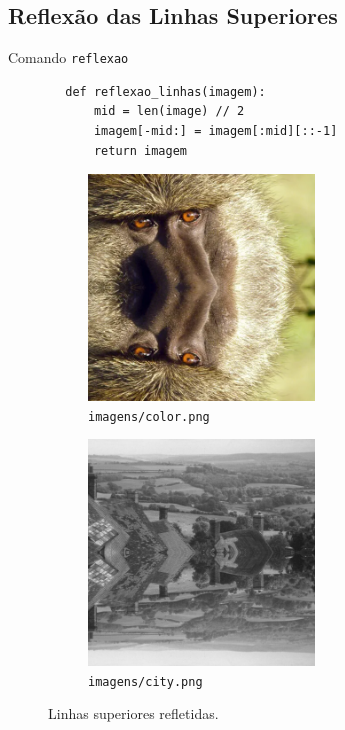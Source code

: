 \subsection{Reflexão das Linhas Superiores}

\begin{listing}[H]
    \caption{Comando \texttt{reflexao}}

    \begin{verbatim}
        def reflexao_linhas(imagem):
            mid = len(image) // 2
            imagem[-mid:] = imagem[:mid][::-1]
            return imagem
    \end{verbatim}
\end{listing}

\begin{figure}[H]
    \centering
    \begin{subfigure}{0.45\textwidth}
        \centering
        \includegraphics[width=6cm]{resultados/colorrefl.png}
        \caption{\texttt{imagens/color.png}}
    \end{subfigure}%
    \begin{subfigure}{0.45\textwidth}
        \centering
        \includegraphics[width=6cm]{resultados/cityrefl.png}
        \caption{\texttt{imagens/city.png}}
    \end{subfigure}

    \caption{Linhas superiores refletidas.}
\end{figure}
